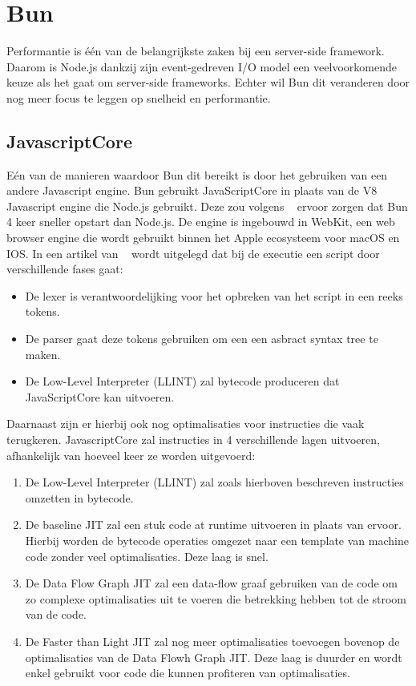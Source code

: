 \section{Bun}
Performantie is één van de belangrijkste zaken bij een server-side framework. 
Daarom is Node.js dankzij zijn event-gedreven I/O model een veelvoorkomende keuze als het gaat om server-side frameworks.
Echter wil Bun dit veranderen door nog meer focus te leggen op snelheid en performantie.

\subsection{JavascriptCore}
Eén van de manieren waardoor Bun dit bereikt is door het gebruiken van een andere Javascript engine.
Bun gebruikt JavaScriptCore in plaats van de V8 Javascript engine die Node.js gebruikt. 
Deze zou volgens ~\textcite{McDonnel2023} ervoor zorgen dat Bun 4 keer sneller opstart dan Node.js. 
De engine is ingebouwd in WebKit, een web browser engine die wordt gebruikt binnen het Apple ecosysteem voor macOS en IOS.
In een artikel van ~\textcite{Pizlo2020} wordt uitgelegd dat bij de executie een script door verschillende fases gaat:
\begin{itemize}
    \item De lexer is verantwoordelijking voor het opbreken van het script in een reeks tokens.
    \item De parser gaat deze tokens gebruiken om een een asbract syntax tree te maken.
    \item De Low-Level Interpreter (LLINT) zal bytecode produceren dat JavaScriptCore kan uitvoeren.
\end{itemize}
Daarnaast zijn er hierbij ook nog optimalisaties voor instructies die vaak terugkeren. 
JavascriptCore zal instructies in 4 verschillende lagen uitvoeren, afhankelijk van hoeveel keer ze worden uitgevoerd:
\begin{enumerate}
    \item De Low-Level Interpreter (LLINT) zal zoals hierboven beschreven instructies omzetten in bytecode.
    \item De baseline JIT zal een stuk code at runtime uitvoeren in plaats van ervoor. 
    Hierbij worden de bytecode operaties omgezet naar een template van machine code zonder veel optimalisaties. Deze laag is snel.
    \item De Data Flow Graph JIT zal een data-flow graaf gebruiken van de code om zo complexe optimalisaties uit te voeren die betrekking hebben tot de stroom van de code.
    \item De Faster than Light JIT zal nog meer optimalisaties toevoegen bovenop de optimalisaties van de Data Flowh Graph JIT. 
    Deze laag is duurder en wordt enkel gebruikt voor code die kunnen profiteren van optimalisaties.
\end{enumerate}
